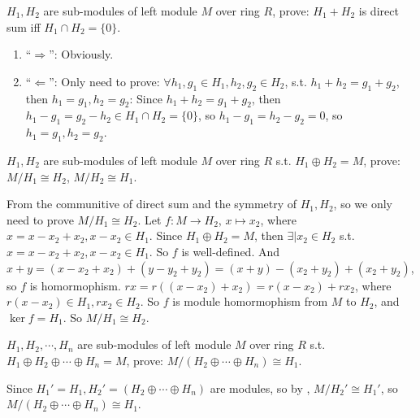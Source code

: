 \documentclass{ctexart}
\newif\ifpreface
\begin{document}
\large
\setlength{\baselineskip}{1.2em}
\ifpreface
    
    \newgeometry{left=2cm,right=2cm,top=2cm,bottom=2cm}
\else
{}
\maketitle
\fi
\begin{problem}
    $H_1,H_2$ are sub-modules of left module $M$ over ring $R$, prove: $H_1+H_2$ is direct sum iff $H_1\cap H_2=\{0\}$.
\end{problem}
\begin{solution}
    \begin{enumerate}
        \item ``$\Rightarrow$'': Obviously.
        \item ``$\Leftarrow$'': Only need to prove: $\forall h_1,g_1\in H_1,h_2,g_2\in H_2$, s.t. $h_1+h_2=g_1+g_2$, then $h_1=g_1,h_2=g_2$: Since $h_1+h_2=g_1+g_2$, then $h_1-g_1=g_2-h_2\in H_1\cap H_2=\{0\}$, so $h_1-g_1=h_2-g_2=0$, so  $h_1=g_1,h_2=g_2$.
    \end{enumerate}
\end{solution}
\begin{problem}\label{pro:2}
    $H_1,H_2$ are sub-modules of left module $M$ over ring $R$ s.t. $H_1\oplus H_2=M$, prove: $M/H_1\cong H_2$, $M/H_2\cong H_1$.
\end{problem}
\begin{solution}
    From the communitive of direct sum and the symmetry of $H_1,H_2$, so we only need to prove $M/H_1\cong H_2$. Let $f:M\to H_2$, $x\mapsto x_2$, where $x=x-x_2+x_2, x-x_2\in H_1$. Since $H_1\oplus H_2=M$, then $\exists | x_2\in H_2$ s.t. $x=x-x_2+x_2, x-x_2\in H_1$. So $f$ is well-defined. And $x+y=(x-x_2+x_2)+(y-y_2+y_2)=(x+y)-(x_2+y_2)+(x_2+y_2)$, so $f$ is homormophism. $rx=r((x-x_2)+x_2)=r(x-x_2)+rx_2$, where $r(x-x_2)\in H_1, rx_2\in H_2$. So $f$ is module homormophism from $M$ to $H_2$, and $\ker f=H_1$. So $M/H_1\cong H_2$.
\end{solution}
\begin{problem}
    $H_1,H_2, \cdots ,H_n$ are sub-modules of left module $M$ over ring $R$ s.t. $H_1\oplus H_2\oplus\cdots\oplus H_n=M$, prove: $M/(H_2\oplus\cdots\oplus H_n)\cong H_1$.
\end{problem}
\begin{solution}
    Since $H_1'=H_1,H_2'=(H_2\oplus\cdots\oplus H_n)$ are modules, so by , $M/H_2'\cong H_1'$, so $M/(H_2\oplus\cdots\oplus H_n)\cong H_1$.
\end{solution}
\end{document}
